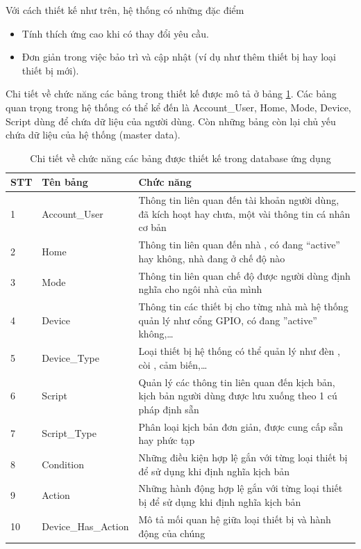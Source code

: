 \documentclass[12pt,a4paper,oneside]{extbook}
\begin{document}
\noindent
Với cách thiết kế như trên, hệ thống có những đặc điểm

\begin{itemize}[topsep=1mm,itemsep=-0.5mm]
\item Tính thích ứng cao khi có thay đổi yêu cầu.
\item Đơn giản trong việc bảo trì và cập nhật (ví dụ như thêm thiết bị hay loại thiết bị mới).
\vspace{1mm}
\end{itemize}

\noindent
Chi tiết về chức năng các bảng trong thiết kế được mô tả ở bảng \ref{tab:db-tables}. Các bảng quan trọng trong hệ thống có thể kể đến là Account\_User, Home, Mode, Device, Script dùng để chứa dữ liệu của người dùng. Còn những bảng còn lại chủ yếu chứa dữ liệu của hệ thống (master data).

\begin{table}[h]
\centering
\caption{Chi tiết về chức năng các bảng được thiết kế trong database ứng dụng}\label{tab:db-tables}
\begin{tabular}{ |l|l|p{10cm}| } 
 \hline
	STT &	Tên bảng &	Chức năng\\ \hline
	1 &	Account\_User &	Thông tin liên quan đến tài khoản người dùng, đã kích hoạt hay chưa, một vài thông tin cá nhân cơ bản\\ \hline
	2 &	Home &	Thông tin liên quan đến nhà , có đang “active” hay không, nhà đang ở chế độ nào\\ \hline
	3 &	Mode &	Thông tin liên quan chế độ được người dùng định nghĩa cho ngôi nhà của mình\\ \hline
	4 &	Device &	Thông tin các thiết bị cho từng nhà  mà hệ thống quản lý như cổng GPIO, có đang ”active” không,\dots\\ \hline
	5 &	Device\_Type &	Loại thiết bị hệ thống có thể quản lý như đèn , còi , cảm biến,\dots\\ \hline
	6 &	Script &	Quản lý các thông tin liên quan đến kịch bản, kịch bản người dùng được lưu xuống theo 1 cú pháp định sẵn\\ \hline
	7 &	Script\_Type &	Phân loại kịch bản đơn giản, được cung cấp sẵn hay phức tạp\\ \hline
	8 &	Condition &	Những điều kiện hợp lệ gắn với từng loại thiết bị để sử dụng khi định nghĩa kịch bản\\ \hline
	9 &	Action &	Những hành động hợp lệ gắn với từng loại thiết bị để sử dụng khi định nghĩa kịch bản\\ \hline
	10 &	Device\_Has\_Action &	Mô tả mối quan hệ giữa loại thiết bị và hành động của chúng\\
 \hline
\end{tabular}
\end{table}
\end{document}
